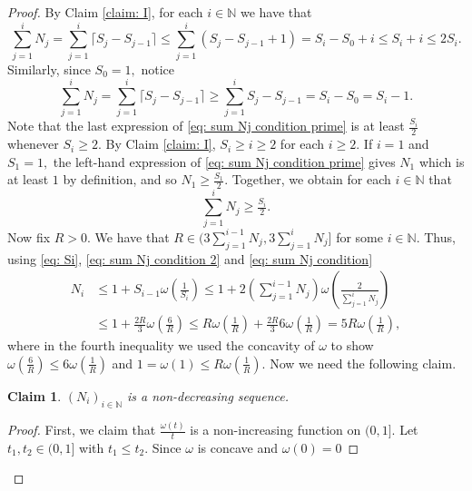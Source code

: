 \documentclass{article}
\newtheorem{claim}[define]{Claim}
\newcommand{\N}{\mathbb{N}}
\begin{document}
\begin{proof}
    By Claim \ref{claim: I}, for each $i\in \N$ we have that
  \begin{equation} \label{eq: sum Nj condition 2}
        \sum_{j=1}^iN_j = \sum_{j=1}^i\lceil S_j-S_{j-1}\rceil \leq \sum_{j=1}^i (S_j-S_{j-1}+1) = S_i -S_0+i\leq S_i+i \leq 2S_i.
 \end{equation} Similarly, since $S_0 = 1,$ notice
 \begin{equation} \label{eq: sum Nj condition prime}
        \sum_{j=1}^iN_j = \sum_{j=1}^i\lceil S_j-S_{j-1}\rceil \geq \sum_{j=1}^i S_j-S_{j-1} = S_i -S_0
 = S_i -1.
 \end{equation} Note that the last expression of \eqref{eq: sum Nj condition prime} is at least $\frac{S_i}{2}$ whenever $S_i \geq 2.$ By Claim \ref{claim: I}, $S_i \geq i \geq 2$ for each $i \geq 2.$ If $i = 1$ and $S_1 =1,$ the left-hand expression of \eqref{eq: sum Nj condition prime} gives $N_1$ which is at least $1$ by definition, and so $N_1 \geq \frac{S_1}{2}.$ Together, we obtain for each $i \in \N$ that
 \begin{equation} \label{eq: sum Nj condition}
     \sum_{j=1}^i N_j \geq \tfrac{S_i}{2}.
 \end{equation}
  Now fix $R>0.$ We have that $R \in (3\sum_{j=1}^{i-1}N_j,3\sum_{j=1}^{i}N_j]$ for some $i \in \N.$ Thus, using \eqref{eq: Si}, \eqref{eq: sum Nj condition 2} and \eqref{eq: sum Nj condition}
    \begin{equation} \label{eq: 4max}
        \begin{split}
            N_i &\leq 1+S_{i-1}\omega\left(\tfrac{1}{S_i}\right) \leq 1+2\left(\sum_{j=1}^{i-1}N_j\right)\omega\left(\frac{2}{\sum_{j=1}^iN_j}\right)
             \\&\leq 1+\tfrac{2R}{3}\omega\left(\tfrac{6}{R}\right) \leq R\omega\left(\tfrac{1}{R}\right) +\tfrac{2R}{3}6\omega\left(\tfrac{1}{R}\right) = 5R\omega\left(\tfrac{1}{R}\right),
        \end{split}
    \end{equation} where in the fourth inequality we used the concavity of $\omega$ to show ${\omega(\frac{6}{R}) \leq 6\omega(\frac{1}{R})}$ and $1=\omega(1) \leq R\omega(\frac{1}{R}).$
    Now we need the following claim.
    \begin{claim} \label{claim: nondec}
        $(N_i)_{i \in \N}$ is a non-decreasing sequence.
    \end{claim}
    \begin{proof}
    First, we claim that $\frac{\omega(t)}{t}$ is a non-increasing function on $(0,1]$. Let $t_1,t_2 \in (0,1]$ with $t_1\leq t_2$. Since $\omega$ is concave and $\omega(0) = 0$

\end{proof}
\end{proof}
\end{document}
